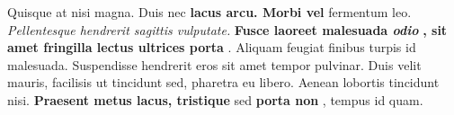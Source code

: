 \documentclass[11pt,letterpaper,openany]{scrbook}
\begin{document}
Quisque at nisi magna. Duis nec \textbf{lacus arcu. Morbi vel} fermentum leo. \textit{Pellentesque hendrerit sagittis vulputate.} \textbf{Fusce laoreet malesuada \textit{odio}} \textbf{, sit amet fringilla lectus ultrices porta} . Aliquam feugiat finibus turpis id malesuada. Suspendisse hendrerit eros sit amet tempor pulvinar. Duis velit mauris, facilisis ut tincidunt sed, pharetra eu libero. Aenean lobortis tincidunt nisi. \textbf{Praesent metus lacus, tristique} sed \textbf{porta non} , tempus id quam.
\end{document}
